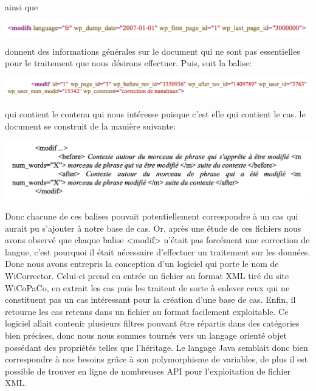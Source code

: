 \documentclass[11pt]{article}
\begin{document}
ainsi que 

\begin{center}
\includegraphics[width=14cm]{exemple6.png} %
\end{center}

donnent des informations g\'{e}n\'{e}rales sur le document qui ne sont pas essentielles pour le traitement que nous d\'{e}sirons effectuer. 
Puis, suit la balise:
\begin{center}
\includegraphics[width=14cm]{exemple7.png} %
\end{center}

qui contient le contenu qui nous int\'{e}resse puisque c'est elle qui contient le cas. le document se construit de la mani\`{e}re suivante:
\begin{center}
\includegraphics[width=14cm]{exemple8.png} %
\end{center}

Donc chacune de ces balises pouvait potentiellement correspondre \`{a} un cas qui aurait pu s'ajouter \`{a} notre base de cas. Or, apr\`{e}s une \'{e}tude de ces fichiers nous avons observ\'{e} que chaque balise <modif> n'\'{e}tait pas forc\'{e}ment une correction de langue, c'est pourquoi il \'{e}tait n\'{e}cessaire d'effectuer un traitement sur les donn\'{e}es.
\newline
\newline
Donc nous avons entrepris la conception d'un logiciel qui porte le nom de WiCorrector. Celui-ci prend en entr\'{e}e un fichier au format XML tir\'{e} du site WiCoPaCo, en extrait les cas puis les traitent de sorte \`{a} enlever ceux qui ne constituent pas un cas int\'{e}ressant pour la cr\'{e}ation d'une base de cas. Enfin, il retourne les cas retenus dans un fichier au format facilement exploitable.
\newline
\newline
Ce logiciel allait contenir plusieurs filtres pouvant \^{e}tre r\'{e}partis dans des cat\'{e}gories bien pr\'{e}cises, donc nous nous sommes tourn\'{e}s vers un langage orient\'{e} objet poss\'{e}dant des propri\'{e}t\'{e}s telles que l'h\'{e}ritage. Le langage Java semblait donc bien correspondre \`{a} nos besoins gr\^{a}ce \`{a} son polymorphisme de variables, de plus il est possible de trouver en ligne de nombreuses API pour l'exploitation de fichier XML.
\newline
\newline
\end{document}

